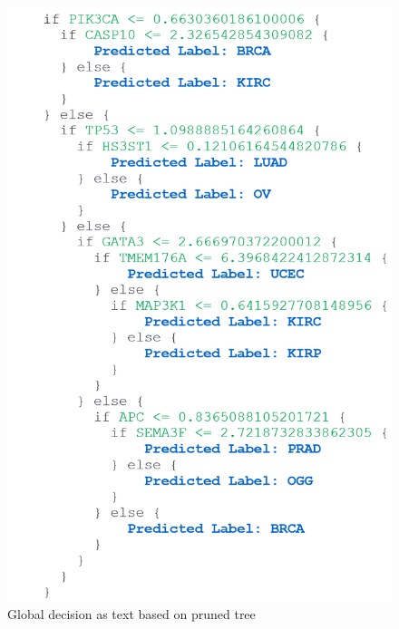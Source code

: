 \begin{figure}[h]
	\centering
		\includegraphics[scale=0.7]{images/dr_global_1.png}
	    \caption{Global decision as text based on pruned tree}
	    \label{fig:skater_decision_as_text}
	    \vspace{-2mm}
\end{figure}

